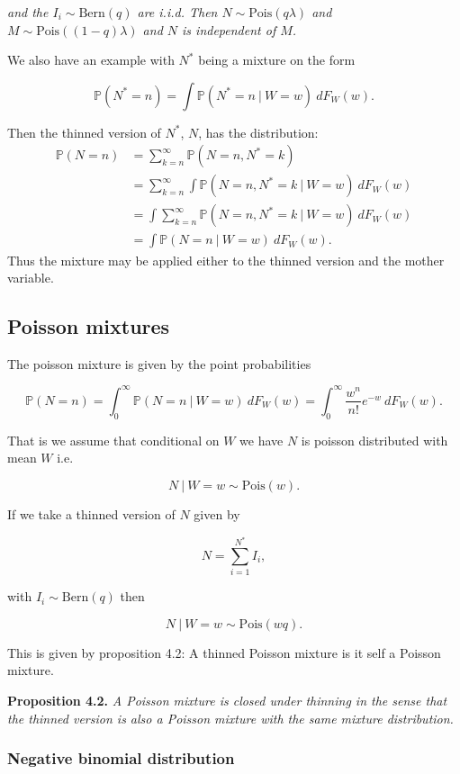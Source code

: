 \documentclass[a4paper,10pt,openany]{book}
\begin{document}
\emph{and the \(I_i\sim \text{Bern}(q)\) are i.i.d. Then \(N\sim \text{Pois}(q\lambda)\) and \(M\sim\text{Pois}((1-q)\lambda)\) and \(N\) is independent of \(M\).}

We also have an example with \(N^*\) being a mixture on the form

\[
\mathbb P(N^*=n)=\int \mathbb P(N^*=n\ \vert\ W=w)\ dF_W(w).
\]

Then the thinned version of \(N^*\), \(N\), has the distribution:
\begin{align*}
\mathbb P(N=n)&=\sum_{k=n}^\infty \mathbb P(N=n,N^*=k)\\
&=\sum_{k=n}^\infty \int \mathbb P(N=n,N^*=k\ \vert\ W=w)\ dF_W(w)\\
&= \int \sum_{k=n}^\infty \mathbb P(N=n,N^*=k\ \vert\ W=w)\ dF_W(w)\\
&= \int  \mathbb P(N=n\ \vert\ W=w)\ dF_W(w).
\end{align*}
Thus the mixture may be applied either to the thinned version and the mother variable.

\hypertarget{poisson-mixtures}{%
\subsection{Poisson mixtures}\label{poisson-mixtures}}

The poisson mixture is given by the point probabilities

\[
\mathbb P(N=n)=\int_0^\infty \mathbb P(N=n\ \vert\ W=w)\ dF_W(w)=\int_0^\infty \frac{w^n}{n!}e^{-w}\ dF_W(w).
\]

That is we assume that conditional on \(W\) we have \(N\) is poisson distributed with mean \(W\) i.e.

\[
N\ \vert\ W=w\sim\text{Pois}(w).
\]

If we take a thinned version of \(N\) given by

\[
N=\sum_{i=1}^{N^*}I_i,
\]

with \(I_i\sim \text{Bern}(q)\) then

\[
N\ \vert\ W=w\sim\text{Pois}(wq).
\]

This is given by proposition 4.2: A thinned Poisson mixture is it self a Poisson mixture.

\textbf{Proposition 4.2.} \emph{A Poisson mixture is closed under thinning in the sense that the thinned version is also a Poisson mixture with the same mixture distribution.}

\hypertarget{negative-binomial-distribution}{%
\subsubsection{Negative binomial distribution}\label{negative-binomial-distribution}}
\end{document}

